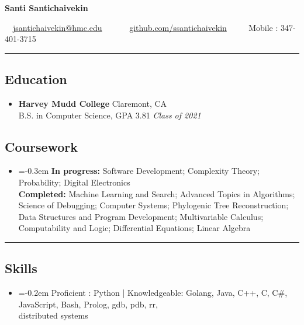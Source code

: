 \documentclass[10.5pt,letterpaper]{article}
\begin{document}
\begin{center}
{\Large \textbf{Santi Santichaivekin}}

\ \ \href{mailto:jsantichaivekin@hmc.edu}{jsantichaivekin@hmc.edu}\ \ 
\ \ \textbullet
\ \ \href{https://github.com/ssantichaivekin}{github.com/ssantichaivekin}
\ \ \textbullet
\ \ Mobile : 347-401-3715

\end{center}


\hrule
\vspace{-0.95em}
\subsection*{Education}
  \begin{itemize}
    \parskip=-0.5em

    \item[]
    \textbf{Harvey Mudd College} \hfill
      Claremont, CA\\
    {B.S. in Computer Science, GPA 3.81
    \hfill \emph{Class of 2021}}
  \end{itemize}
  \vspace{-2.07em}
\subsection*{Coursework}
\begin{itemize}
\item[]
    \parskip=-0.3em
  \textbf{In progress:}  Software Development; Complexity Theory; Probability; Digital Electronics \\
  \textbf{Completed:} Machine Learning and Search; Advanced Topics in Algorithms; 
  Science of Debugging;
  Computer Systems;
  Phylogenic Tree Reconstruction;
  Data Structures and Program Development; 
  Multivariable Calculus;
  Computability and Logic; 
  Differential Equations;
  Linear Algebra
  

\end{itemize}

\hrule
\vspace{-0.95em}
\subsection*{Skills}
\begin{itemize}
\item[]
    \parskip=-0.2em
  Proficient : Python | Knowledgeable: Golang, Java, C++, C, C\#, JavaScript, Bash, Prolog, gdb, pdb, rr,\\
  distributed systems
    
\end{itemize}
\end{document}
